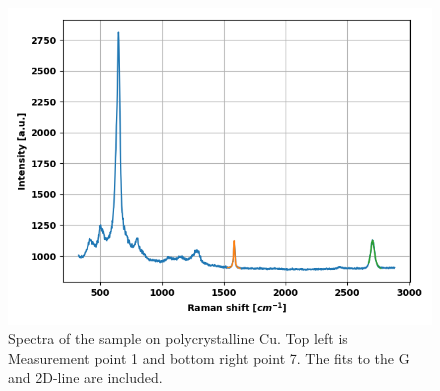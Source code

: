 \documentclass[12pt,a4paper]{article}
\begin{document}
\begin{figure}
\includegraphics[scale=0.5]{Bilder/part6/7.png}
\caption{Spectra of the sample on polycrystalline Cu. Top left is Measurement point 1 and bottom right point 7. The fits to the G and 2D-line are included.}
\label{fig:appendix_6}
\end{figure}


\newpage

\end{document}

